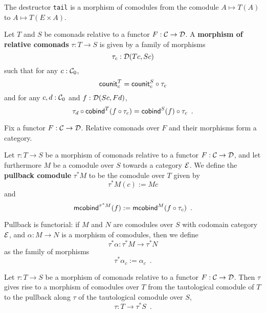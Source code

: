 \documentclass{amsart}
\newcommand{\fat}[1]{\textbf{#1}}
\begin{document}
% 
%   
% 
%  
%  





\begin{example}
 The destructor \lstinline!tail! is a morphism of comodules from the comodule $A \mapsto T(A)$ to $A\mapsto T(E\times A)$.
\end{example}


\begin{definition}
 Let $T$ and $S$ be comonads relative to a functor $F : \C \to \D$. A \fat{morphism of relative comonads} $\tau : T \to S$
  is given by a family of morphisms \[\tau_c : \D(Tc,Sc)\] such that for any $c : \C_0$,
     \[  \counit^T_c = \comp{\tau_c}{\counit^S_c} \]
   and for any $c,d : \C_0$ and $f : \D(Sc,Fd)$,
   \[  \comp{\cobind^T(\comp{\tau_c}{f})}{\tau_d} = \comp{\tau_c}{\cobind^S(f)} \enspace .  \]
\end{definition}

\begin{remark}
 Fix a functor $F : \C\to\D$. Relative comonads over $F$ and their morphisms form a category.
\end{remark}


\begin{definition}\label{def:pullback_comodule}
  Let $\tau : T\to S$ be a morphism of comonads relative to a functor $F : \C \to \D$, and let furthermore $M$ be a 
  comodule over $S$ towards a category $\E$. We define the \fat{pullback comodule} $\tau^*M$ to be the comodule over $T$ given by
  \[  \tau^*M(c) := Mc \]
  and 
   \[ \mcobind^{\tau^*M}(f) := \mcobind^M(\comp{\tau_c}{f}) \enspace . \]
   
  \noindent
  Pullback is functorial: if $M$ and $N$ are comodules over $S$ with codomain category $\E$, and $\alpha : M\to N$ is 
    a morphism of comodules, then we define \[\tau^*\alpha : \tau^*M \to \tau^*N\] 
    as the family of morphisms
     \[ \tau^*\alpha_c := \alpha_c \enspace . \]
\end{definition}

\begin{definition}
  Let $\tau : T\to S$ be a morphism of comonads relative to a functor $F : \C \to \D$.
  Then $\tau$ gives rise to a morphism of comodules over $T$ from the tautological comodule
  of $T$ to the pullback along $\tau$ of the tautological comodule over $S$,
  \[ \tau : T \to \tau^*S \enspace . \]
\end{definition}
\end{document}
